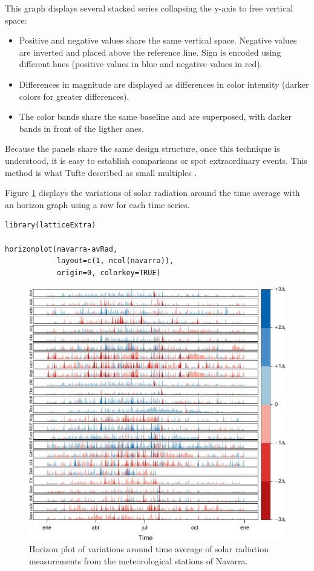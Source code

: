 \documentclass[smallroyalvopaper]{memoir}
\begin{document}
This graph displays several stacked series collapsing the y-axis
to free vertical space:
\begin{itemize}
\item Positive and negative values share the same vertical
space. Negative values are inverted and placed above the
reference line. Sign is encoded using different hues (positive
values in blue and negative values in red).
\item Differences in magnitude are displayed as differences in color
intensity (darker colors for greater differences).
\item The color bands share the same baseline and are superposed, with
darker bands in front of the ligther ones.
\end{itemize}

Because the panels share the same design structure, once this
technique is understood, it is easy to establish comparisons or spot
extraordinary events.  This method is what Tufte described as small
multiples \cite{Tufte1990}.

Figure \ref{fig:navarraHorizonplot} displays the variations of
solar radiation around the time average with an horizon graph
using a row for each time series.


\lstset{language=R,numbers=none}
\begin{lstlisting}
library(latticeExtra)

horizonplot(navarra-avRad,
            layout=c(1, ncol(navarra)),
            origin=0, colorkey=TRUE)
\end{lstlisting}

\begin{figure}[htb]
\centering
\includegraphics[width=.9\linewidth]{figs/navarraHorizonplot.pdf}
\caption{\label{fig:navarraHorizonplot}Horizon plot of variations around time average of solar radiation measurements from the meteorological stations of Navarra.}
\end{figure}
\end{document}
